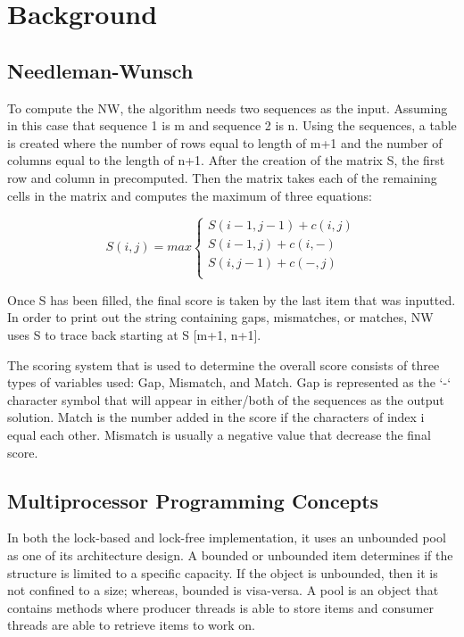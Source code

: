 \documentclass[letterpaper, 10 pt, conference]{IEEEconf}
\begin{document}
\section{Background}

\subsection{Needleman-Wunsch}

To compute the NW, the algorithm needs two sequences as the input. Assuming in this case that sequence 1 is m and sequence 2 is n. Using the sequences, a table is created where the number of rows equal to length of m+1 and the number of columns equal to the length of n+1. After the creation of the matrix S, the first row and column in precomputed. Then the matrix takes each of the remaining cells in the matrix and computes the maximum of three equations: 


\begin{equation}
	S(i, j) = max 
	\begin{cases}
		S(i-1, j-1) + c(i, j)\\
		S(i-1, j) + c(i, -)\\
		S(i, j-1) + c(-, j)\\
	\end{cases}
\end{equation}

Once S has been filled, the final score is taken by the last item that was inputted. In order to print out the string containing gaps, mismatches, or matches, NW uses S to trace back starting at S [m+1, n+1].

The scoring system that is used to determine the overall score consists of three types of variables used: Gap, Mismatch, and Match. Gap is represented as the ‘-‘ character symbol that will appear in either/both of the sequences as the output solution. Match is the number added in the score if the characters of index i equal each other. Mismatch is usually a negative value that decrease the final score. 

\subsection{Multiprocessor Programming Concepts}
In both the lock-based and lock-free implementation, it uses an unbounded pool as one of its architecture design. A bounded or unbounded item determines if the structure is limited to a specific capacity. If the object is unbounded, then it is not confined to a size; whereas, bounded is visa-versa. A pool is an object that contains methods where producer threads is able to store items and consumer threads are able to retrieve items to work on. 
\end{document}
